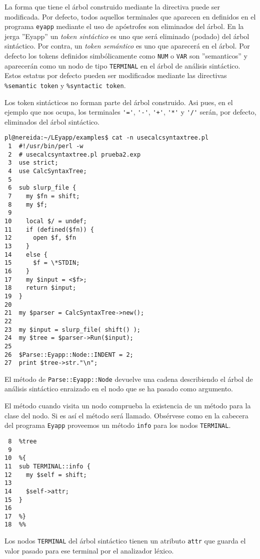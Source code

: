 La forma que tiene el árbol construido mediante la directiva 
puede ser modificada. Por defecto, todos aquellos terminales
que aparecen en 
definidos en el programa \verb|eyapp| mediante el uso de apóstrofes
son eliminados del árbol. En la jerga ''Eyapp'' un
\emph{token sintáctico} es uno que será eliminado (podado)
del árbol sintáctico. Por contra, un \emph{token semántico} es uno que
aparecerá en el árbol. Por defecto los tokens definidos simbólicamente
como \verb|NUM| o \verb|VAR| son ''semanticos'' y aparecerán como un nodo de 
tipo \verb|TERMINAL| en el 
árbol de análisis sintáctico. Estos estatus por defecto 
pueden ser modificados mediante las directivas \verb|%semantic token|
y \verb|%syntactic token|.

Los token sintácticos no forman parte del árbol construido.
Asi pues, en el ejemplo que nos ocupa, los terminales \verb|'='|,
\verb|'-'|,
\verb|'+'|,
\verb|'*'| y
\verb|'/'|
serán, por defecto, eliminados del árbol sintáctico. 


\begin{verbatim}
pl@nereida:~/LEyapp/examples$ cat -n usecalcsyntaxtree.pl
 1  #!/usr/bin/perl -w
 2  # usecalcsyntaxtree.pl prueba2.exp
 3  use strict;
 4  use CalcSyntaxTree;
 5
 6  sub slurp_file {
 7    my $fn = shift;
 8    my $f;
 9
10    local $/ = undef;
11    if (defined($fn)) {
12      open $f, $fn
13    }
14    else {
15      $f = \*STDIN;
16    }
17    my $input = <$f>;
18    return $input;
19  }
20
21  my $parser = CalcSyntaxTree->new();
22
23  my $input = slurp_file( shift() );
24  my $tree = $parser->Run($input);
25
26  $Parse::Eyapp::Node::INDENT = 2;
27  print $tree->str."\n";
\end{verbatim}

El método  de \verb|Parse::Eyapp::Node|
devuelve una cadena describiendo el árbol de análisis
sintáctico enraizado en el nodo
que se ha pasado como argumento.

El método  cuando visita un nodo comprueba la existencia de 
un método  para la clase del nodo. Si es así el método
será llamado. Obsérvese como en la cabecera del programa
\verb|Eyapp| proveemos un método
\verb|info| para los nodos \verb|TERMINAL|.
\begin{verbatim}
 8  %tree
 9
10  %{
11  sub TERMINAL::info {
12    my $self = shift;
13
14    $self->attr;
15  }
16
17  %}
18  %%
\end{verbatim}

Los nodos \verb|TERMINAL| del árbol sintáctico 
tienen un atributo \verb|attr| que guarda 
el valor pasado para ese terminal por el analizador
léxico.

